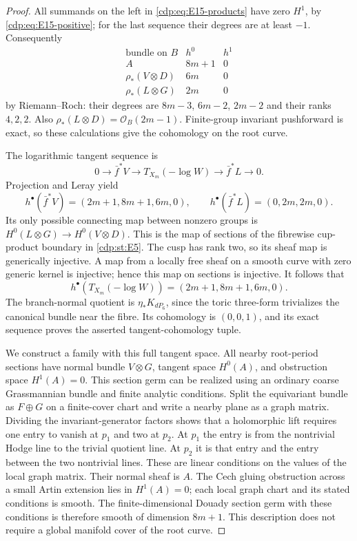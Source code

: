\begin{proof}
All summands on the left in \eqref{cdp:eq:E15-products} have zero
$H^1$, by \eqref{cdp:eq:E15-positive}; for the last sequence their
degrees are at least $-1$. Consequently
\[
\begin{array}{c|c|c}
\text{bundle on }B&h^0&h^1\\ \hline
 A&8m+1&0\\
 \rho_*(V\otimes D)&6m&0\\
 \rho_*(L\otimes G)&2m&0
\end{array}
\]
by Riemann--Roch: their degrees are $8m-3$, $6m-2$, $2m-2$
and their ranks $4,2,2$. Also
$\rho_*(L\otimes D)=\mathcal O_B(2m-1)$.
Finite-group invariant pushforward is exact, so these calculations
give the cohomology on the root curve.

The logarithmic tangent sequence is
\[
 0\longrightarrow\bar f^*V\longrightarrow T_{X_m}(-\log W)
 \longrightarrow\bar f^*L\longrightarrow0.
\]
Projection and Leray yield
\[
 h^\bullet(\bar f^*V)=(2m+1,8m+1,6m,0),\qquad
 h^\bullet(\bar f^*L)=(0,2m,2m,0).
\]
Its only possible connecting map between nonzero groups is
$H^0(L\otimes G)\to H^0(V\otimes D)$. This is the map of
sections of the fibrewise cup-product boundary in \ref{cdp:st:E5}. The cusp
has rank two, so its sheaf map is generically injective. A map
from a locally free sheaf on a smooth curve with zero generic
kernel is injective; hence this map on sections is injective.
It follows that
\[
 h^\bullet(T_{X_m}(-\log W))=(2m+1,8m+1,6m,0).
\]
The branch-normal quotient is $\eta_*K_{dP_6}$, since the toric
three-form trivializes the canonical bundle near the fibre.
Its cohomology is $(0,0,1)$, and its exact sequence proves the
asserted tangent-cohomology tuple.

We construct a family with this full tangent space. All nearby
root-period sections have normal bundle $V\otimes G$, tangent
space $H^0(A)$, and obstruction space $H^1(A)=0$. This section
germ can be realized using an ordinary coarse Grassmannian bundle
and finite analytic conditions. Split the equivariant bundle as
$F\oplus G$ on a finite-cover chart and write a nearby plane as
a graph matrix. Dividing the invariant-generator factors shows
that a holomorphic lift requires one entry to vanish at $p_1$
and two at $p_2$. At $p_1$ the entry is from the nontrivial Hodge
line to the trivial quotient line. At $p_2$ it is that entry
and the entry between the two nontrivial lines. These are linear
conditions on the values of the local graph matrix. Their normal
sheaf is $A$. The Cech gluing obstruction across a small Artin
extension lies in $H^1(A)=0$; each local graph chart and its
stated conditions is smooth. The finite-dimensional Douady
section germ with these conditions is therefore smooth of
dimension $8m+1$. This description does not require a global
manifold cover of the root curve.


\end{proof}
